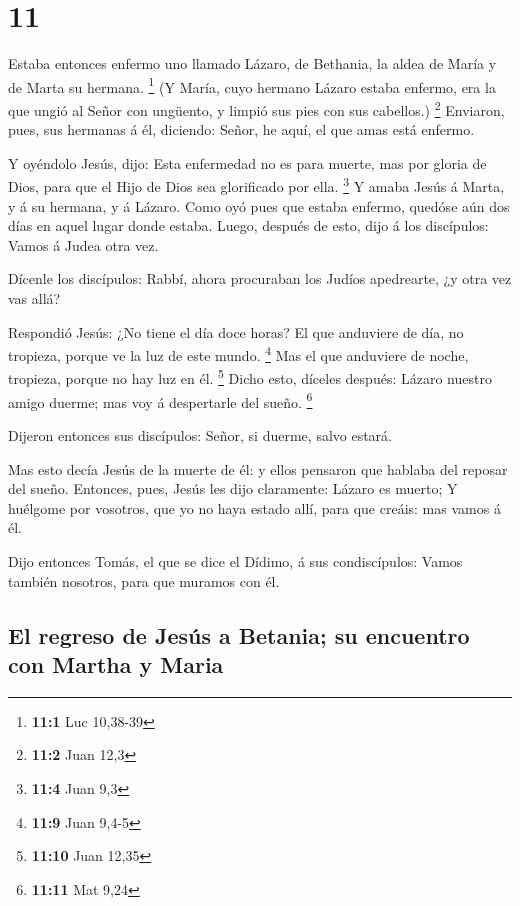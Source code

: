\hypertarget{section-10}{%
\section{11}\label{section-10}}

 Estaba entonces enfermo uno llamado Lázaro, de Bethania, la
aldea de María y de Marta su hermana. \footnote{\textbf{11:1} Luc
  10,38-39}  (Y María, cuyo hermano Lázaro estaba enfermo,
era la que ungió al Señor con ungüento, y limpió sus pies con sus
cabellos.) \footnote{\textbf{11:2} Juan 12,3}  Enviaron,
pues, sus hermanas á él, diciendo: Señor, he aquí, el que amas está
enfermo.

 Y oyéndolo Jesús, dijo: Esta enfermedad no es para muerte,
mas por gloria de Dios, para que el Hijo de Dios sea glorificado por
ella. \footnote{\textbf{11:4} Juan 9,3}  Y amaba Jesús á
Marta, y á su hermana, y á Lázaro.  Como oyó pues que estaba
enfermo, quedóse aún dos días en aquel lugar donde estaba. 
Luego, después de esto, dijo á los discípulos: Vamos á Judea otra vez.

 Dícenle los discípulos: Rabbí, ahora procuraban los Judíos
apedrearte, ¿y otra vez vas allá?

 Respondió Jesús: ¿No tiene el día doce horas? El que
anduviere de día, no tropieza, porque ve la luz de este mundo.
\footnote{\textbf{11:9} Juan 9,4-5}  Mas el que anduviere
de noche, tropieza, porque no hay luz en él. \footnote{\textbf{11:10}
  Juan 12,35}  Dicho esto, díceles después: Lázaro nuestro
amigo duerme; mas voy á despertarle del sueño. \footnote{\textbf{11:11}
  Mat 9,24}

 Dijeron entonces sus discípulos: Señor, si duerme, salvo
estará.

 Mas esto decía Jesús de la muerte de él: y ellos pensaron
que hablaba del reposar del sueño.  Entonces, pues, Jesús
les dijo claramente: Lázaro es muerto;  Y huélgome por
vosotros, que yo no haya estado allí, para que creáis: mas vamos á él.

 Dijo entonces Tomás, el que se dice el Dídimo, á sus
condiscípulos: Vamos también nosotros, para que muramos con él.

\hypertarget{el-regreso-de-jesuxfas-a-betania-su-encuentro-con-martha-y-maria}{%
\subsection{El regreso de Jesús a Betania; su encuentro con Martha y
Maria}\label{el-regreso-de-jesuxfas-a-betania-su-encuentro-con-martha-y-maria}}

